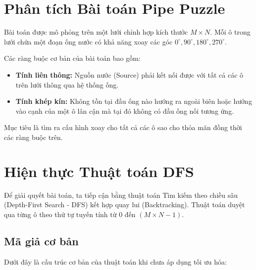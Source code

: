 \documentclass[12pt,a4paper]{article}
\begin{document}
\section{Phân tích Bài toán Pipe Puzzle}
Bài toán được mô phỏng trên một lưới chỉnh hợp kích thước $M \times N$. Mỗi ô trong lưới chứa một đoạn ống nước có khả năng xoay các góc $0^\circ, 90^\circ, 180^\circ, 270^\circ$.

Các ràng buộc cơ bản của bài toán bao gồm:
\begin{itemize}
    \item \textbf{Tính liên thông:} Nguồn nước (Source) phải kết nối được với tất cả các ô trên lưới thông qua hệ thống ống.
    \item \textbf{Tính khép kín:} Không tồn tại đầu ống nào hướng ra ngoài biên hoặc hướng vào cạnh của một ô lân cận mà tại đó không có đầu ống nối tương ứng.
\end{itemize}

Mục tiêu là tìm ra cấu hình xoay cho tất cả các ô sao cho thỏa mãn đồng thời các ràng buộc trên.

\section{Hiện thực Thuật toán DFS}
Để giải quyết bài toán, ta tiếp cận bằng thuật toán Tìm kiếm theo chiều sâu (Depth-First Search - DFS) kết hợp quay lui (Backtracking). Thuật toán duyệt qua từng ô theo thứ tự tuyến tính từ $0$ đến $(M \times N - 1)$.

\subsection{Mã giả cơ bản}
Dưới đây là cấu trúc cơ bản của thuật toán khi chưa áp dụng tối ưu hóa:

\begin{algorithm}[H]
\DontPrintSemicolon
{}
\caption{Giải thuật DFS cho Pipe Puzzle}
\end{algorithm}
\end{document}
